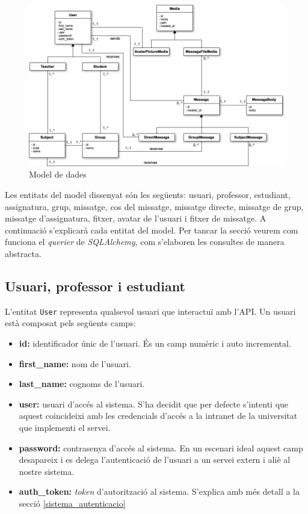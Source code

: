 \begin{figure}[h!]
    \includegraphics[scale=0.5]{img/uml.png}
    \centering
    \caption{Model de dades}
    \label{fig:model}
\end{figure}

Les entitats del model dissenyat són les següents: usuari, professor, estudiant, assignatura, grup, missatge, cos del missatge, missatge directe, missatge de grup, missatge d'assignatura, fitxer, avatar de l'usuari i fitxer de missatge. A continuació s'explicarà cada entitat del model. Per tancar la secció veurem com funciona el \emph{querier} de \emph{SQLAlchemy}, com s'elaboren les consultes de manera abstracta.

	\subsection{Usuari, professor i estudiant} \label{usuari_professor_estudiant}

	L'entitat \texttt{User} representa qualsevol usuari que interactuï amb l'\ac{API}. Un usuari està composat pels següents camps: 
	
	\begin{itemize}
		\item \textbf{id:} identificador únic de l'usuari. És un camp numèric i auto incremental.
		\item \textbf{first\_name:} nom de l'usuari.
		\item \textbf{last\_name:} cognoms de l'usuari.
		\item \textbf{user:} usuari d'accés al sistema. S'ha decidit que per defecte s'intenti que aquest coincideixi amb les credencials d'accés a la intranet de la universitat que implementi el servei.
		\item \textbf{password:} contrasenya d'accés al sistema. En un escenari ideal aquest camp desapareix i es delega l'autenticació de l'usuari a un servei extern i aliè al nostre sistema.
		\item \textbf{auth\_token:} \emph{token} d'autorització al sistema. S'explica amb més detall a la secció \ref{sistema_autenticacio}
	\end{itemize}
	
